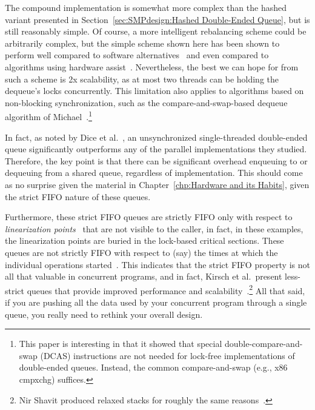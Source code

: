 The compound implementation is somewhat more complex than the
hashed variant presented in
Section~\ref{sec:SMPdesign:Hashed Double-Ended Queue},
but is still reasonably simple.
Of course, a more intelligent rebalancing scheme could be arbitrarily
complex, but the simple scheme shown here has been shown to
perform well compared to software
alternatives~\cite{LukeDalessandro:2011:ASPLOS:HybridNOrecSTM:deque}
and even compared to algorithms using hardware
assist~\cite{DavidDice:2010:SCA:HTM:deque}.
Nevertheless, the best we can hope for from such a scheme
is 2x scalability, as at most two threads can be holding the
dequeue's locks concurrently.
This limitation also applies to algorithms based on non-blocking
synchronization, such as the compare-and-swap-based dequeue algorithm of
Michael~\cite{DBLP:conf/europar/Michael03}.\footnote{
	This paper is interesting in that it showed that special
	double-compare-and-swap (DCAS) instructions are not needed
	for lock-free implementations of double-ended queues.
	Instead, the common compare-and-swap (e.g., x86 cmpxchg)
	suffices.}

In fact, as noted by Dice et al.~\cite{DavidDice:2010:SCA:HTM:deque},
an unsynchronized single-threaded double-ended queue significantly
outperforms any of the parallel implementations they studied.
Therefore, the key point is that there can be significant overhead enqueuing to
or dequeuing from a shared queue, regardless of implementation.
This should come as no surprise given the material in
Chapter~\ref{chp:Hardware and its Habits}, given the strict
FIFO nature of these queues.

Furthermore, these strict FIFO queues are strictly FIFO only with
respect to
\emph{linearization points}~\cite{Herlihy:1990:LCC:78969.78972}
that are not visible to the caller, in fact, in these examples,
the linearization points are buried in the lock-based critical
sections.
These queues are not strictly FIFO with respect to (say) the times at which
the individual operations started~\cite{AndreasHaas2012FIFOisnt}.
This indicates that the strict FIFO property is not all that valuable
in concurrent programs, and in fact, Kirsch et al.~present less-strict
queues that provide improved performance and
scalability~\cite{ChristophMKirsch2012FIFOisntTR}.\footnote{
	Nir Shavit produced relaxed stacks for roughly the same
	reasons~\cite{Shavit:2011:DSM:1897852.1897873}.}
All that said, if you are pushing all the data used by your concurrent
program through a single queue, you really need to rethink your
overall design.

